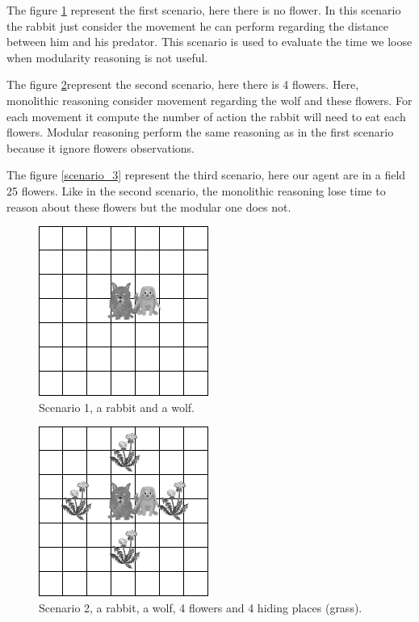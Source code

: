 \documentclass{aamas2012}
\begin{document}
	The figure \ref{scenario_1} represent the first scenario, here there is no flower.
	In this scenario the rabbit just consider the movement he can perform regarding the distance between him and his predator.
	This scenario is used to evaluate the time we loose when modularity reasoning is not useful.
	
	The figure \ref{scenario_2}represent the second scenario, here there is 4 flowers.
	Here, monolithic reasoning consider movement regarding the wolf and these flowers.
	For each movement it compute the number of action the rabbit will need to eat each flowers.
	Modular reasoning perform the same reasoning as in the first scenario because it ignore flowers observations.
	
	The figure \ref{scenario_3} represent the third scenario, here our agent are in a field 25 flowers.
	Like in the second scenario, the monolithic reasoning lose time to reason about these flowers but the modular one does not.
	
	\begin{figure}
		\centering
		\includegraphics[keepaspectratio=true, scale=0.5]{scenario_1.png}
		\caption
		{
			\label{scenario_1}
			Scenario 1, a rabbit and a wolf.
		}
	\end{figure}

	\begin{figure}
		\centering
		\includegraphics[keepaspectratio=true, scale=0.5]{scenario_2.png}
		\caption
		{
			\label{scenario_2}
			Scenario 2, a rabbit, a wolf, 4 flowers and 4 hiding places (grass).
		}
	\end{figure}
	
\end{document}
